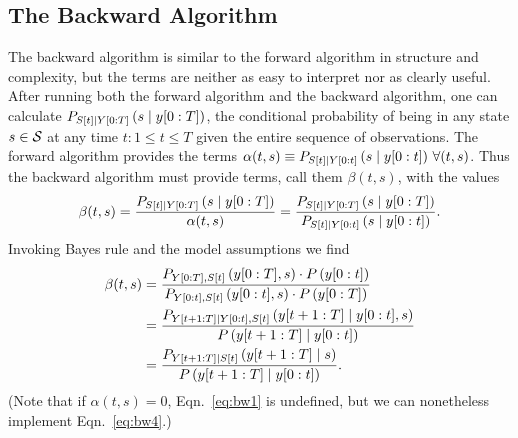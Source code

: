 \subsection{The Backward Algorithm}
\label{sec:backward}

The  backward algorithm is similar to the
forward algorithm in structure and complexity, but the terms are
neither as easy to interpret nor as clearly useful.  After running
both the forward algorithm and the backward algorithm, one can
calculate $P_{{S}{[t]}\mid Y[0:T]} \left(s\mid y[0:T] \right)$,
the conditional probability of being in any state $s \in \states$ at
any time $t: 1\leq t \leq T$ given the entire sequence of
observations.  The forward algorithm provides the terms $\alpha(t,s)
\equiv P_{{S}{[t]}\mid Y[0:t]} \left(s\mid y[0:t] \right)\,
\forall (t,s)$.  Thus the backward algorithm must provide terms, call
them $\beta(t,s)$, with the values
\begin{equation}
  \label{eq:bw1} \beta(t,s) =
  \frac{P_{{S}{[t]}\mid Y[0:T]} \left(s\mid y[0:T] \right)}
  {\alpha(t,s)} = \frac{P_{{S}{[t]}\mid Y[0:T]}
    \left(s\mid y[0:T] \right)}
  {P_{{S}{[t]}\mid Y[0:t]} \left(s\mid y[0:t] \right)}.
\end{equation}
Invoking Bayes rule and the model assumptions we find
\begin{align}
  \mlabel{eq:bw2} \beta(t,s) &= \frac{P_{\ts{Y}{0}{T},\ti{S}{t}}
    \left(\ts{y}{0}{T},s \right)\cdot P \left(\ts{y}{0}{t} \right)}
  {P_{\ts{Y}{0}{t},\ti{S}{t}}
    \left(\ts{y}{0}{t},s \right)\cdot P \left(\ts{y}{0}{T} \right)}\\
  \mlabel{eq:bw3} &= \frac{P_{\ts{Y}{t+1}{T}\given \ts{Y}{0}{t},\ti{S}{t}}
    \left(\ts{y}{t+1}{T}\given \ts{y}{0}{t},s \right)} {P
    \left(\ts{y}{t+1}{T}\given \ts{y}{0}{t} \right)}\\
  \label{eq:bw4}
  & = \frac{P_{\ts{Y}{t+1}{T}\given \ti{S}{t}} \left(\ts{y}{t+1}{T}\given s
    \right)} {P \left(\ts{y}{t+1}{T}\given \ts{y}{0}{t} \right)}.
\end{align}
(Note that if $\alpha(t,s)=0$, Eqn.~\eqref{eq:bw1} is undefined, but
we can nonetheless implement Eqn.~\eqref{eq:bw4}.)

